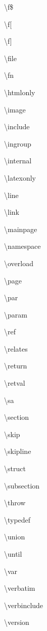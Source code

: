 \begin{DoxyDescription}
\item[]\textbackslash{}f\$ 
\item[]\textbackslash{}f\mbox{[} 
\item[]\textbackslash{}f\mbox{]} 
\item[]\textbackslash{}file 
\item[]\textbackslash{}fn 
\item[]\textbackslash{}htmlonly 
\item[]\textbackslash{}image 
\item[]\textbackslash{}include 
\item[]\textbackslash{}ingroup 
\item[]\textbackslash{}internal 
\item[]\textbackslash{}latexonly 
\item[]\textbackslash{}line 
\item[]\textbackslash{}link 
\item[]\textbackslash{}mainpage 
\item[]\textbackslash{}namespace 
\item[]\textbackslash{}overload 
\item[]\textbackslash{}page 
\item[]\textbackslash{}par 
\item[]\textbackslash{}param 
\item[]\textbackslash{}ref 
\item[]\textbackslash{}relates 
\item[]\textbackslash{}return 
\item[]\textbackslash{}retval 
\item[]\textbackslash{}sa 
\item[]\textbackslash{}section 
\item[]\textbackslash{}skip 
\item[]\textbackslash{}skipline 
\item[]\textbackslash{}struct 
\item[]\textbackslash{}subsection 
\item[]\textbackslash{}throw 
\item[]\textbackslash{}typedef 
\item[]\textbackslash{}union 
\item[]\textbackslash{}until 
\item[]\textbackslash{}var 
\item[]\textbackslash{}verbatim 
\item[]\textbackslash{}verbinclude 
\item[]\textbackslash{}version 

\end{DoxyDescription}
